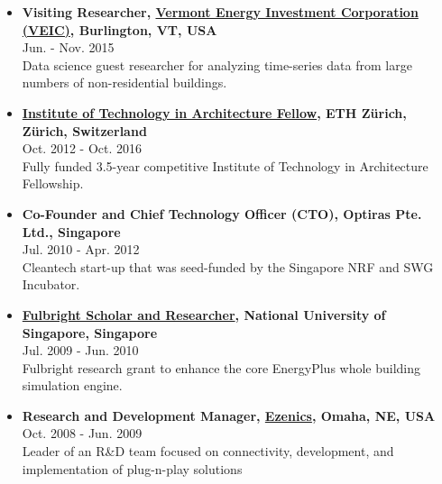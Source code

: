 \documentclass[10pt,a4paper]{article}
\begin{document}
\begin{small}
\begin{itemize}
\item {\bf Visiting Researcher, \href{https://www.veic.org}{Vermont Energy Investment Corporation (VEIC)}, Burlington, VT, USA}\\ 
Jun. - Nov. 2015\\
Data science guest researcher for analyzing time-series data from large numbers of non-residential buildings.

\item {\bf \href{https://ita.arch.ethz.ch/Doctoral-Program/a-t-phd-fellows.html}{Institute of Technology in Architecture Fellow}, ETH Z\"urich, Z\"urich, Switzerland}\\
Oct. 2012 - Oct. 2016\\
Fully funded 3.5-year competitive Institute of Technology in Architecture Fellowship. 

\item {\bf Co-Founder and Chief Technology Officer (CTO), Optiras Pte. Ltd., Singapore}\\ 
Jul. 2010 - Apr. 2012\\
Cleantech start-up that was seed-funded by the Singapore NRF and SWG Incubator. 

\item {\bf \href{https://fulbrightscholars.org}{Fulbright Scholar and Researcher}, National University of Singapore, Singapore}\\
Jul. 2009 - Jun. 2010\\
Fulbright research grant to enhance the core EnergyPlus whole building simulation engine.

\item {\bf Research and Development Manager, \href{https://www.ezenics.com}{Ezenics}, Omaha, NE, USA}\\
Oct. 2008 - Jun. 2009\\
Leader of an R\&D team focused on connectivity, development, and implementation of plug-n-play solutions



\end{itemize}









\end{small}
\end{document}
